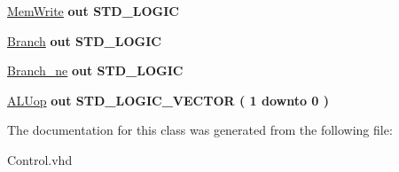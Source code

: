 \begin{DoxyCompactItemize}
\item 
\hypertarget{class_control_af268f4bd077313d14130fa77402beccb}{\hyperlink{class_control_af268f4bd077313d14130fa77402beccb}{\-Mem\-Write}  {\bfseries {\bfseries out }} {\bfseries \-S\-T\-D\-\_\-\-L\-O\-G\-I\-C } }\label{class_control_af268f4bd077313d14130fa77402beccb}

\item 
\hypertarget{class_control_a8bcff3a33808999c1998531a90201ac6}{\hyperlink{class_control_a8bcff3a33808999c1998531a90201ac6}{\-Branch}  {\bfseries {\bfseries out }} {\bfseries \-S\-T\-D\-\_\-\-L\-O\-G\-I\-C } }\label{class_control_a8bcff3a33808999c1998531a90201ac6}

\item 
\hypertarget{class_control_a24dd763afcb5d8a8d91e3c3f5a415704}{\hyperlink{class_control_a24dd763afcb5d8a8d91e3c3f5a415704}{\-Branch\-\_\-ne}  {\bfseries {\bfseries out }} {\bfseries \-S\-T\-D\-\_\-\-L\-O\-G\-I\-C } }\label{class_control_a24dd763afcb5d8a8d91e3c3f5a415704}

\item 
\hypertarget{class_control_accc0d3f810d226b65ebd44774daada7e}{\hyperlink{class_control_accc0d3f810d226b65ebd44774daada7e}{\-A\-L\-Uop}  {\bfseries {\bfseries out }} {\bfseries \-S\-T\-D\-\_\-\-L\-O\-G\-I\-C\-\_\-\-V\-E\-C\-T\-O\-R (   1    downto    0  ) } }\label{class_control_accc0d3f810d226b65ebd44774daada7e}

\end{DoxyCompactItemize}


\-The documentation for this class was generated from the following file\-:\begin{DoxyCompactItemize}
\item 
\-Control.\-vhd\end{DoxyCompactItemize}
